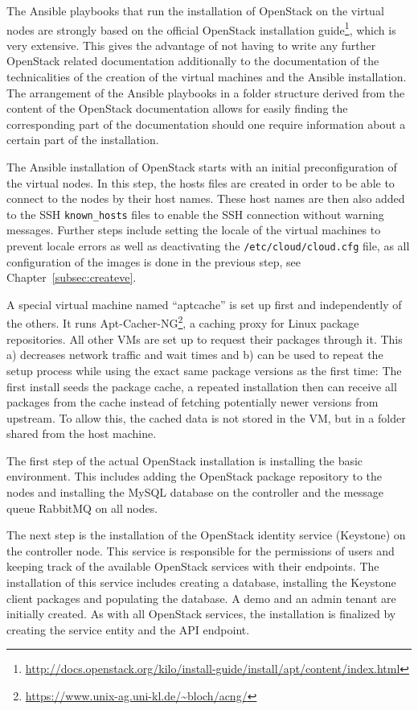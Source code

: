 The Ansible playbooks that run the installation of OpenStack on the virtual nodes are strongly based on the official OpenStack installation guide\footnote{\url{http://docs.openstack.org/kilo/install-guide/install/apt/content/index.html}}, which is very extensive. This gives the advantage of not having to write any further OpenStack related documentation additionally to the documentation of the technicalities of the creation of the virtual machines and the Ansible installation. The arrangement of the Ansible playbooks in a folder structure derived from the content of the OpenStack documentation allows for easily finding the corresponding part of the documentation should one require information about a certain part of the installation.

The Ansible installation of OpenStack starts with an initial preconfiguration of the virtual nodes. In this step, the hosts files are created in order to be able to connect to the nodes by their host names. These host names are then also added to the SSH \verb|known_hosts| files to enable the SSH connection without warning messages. Further steps include setting the locale of the virtual machines to prevent locale errors as well as deactivating the \verb|/etc/cloud/cloud.cfg| file, as all configuration of the images is done in the previous step, see Chapter~\ref{subsec:createve}.

A special virtual machine named ``aptcache'' is set up first and independently of the others. It runs Apt-Cacher-NG\footnote{\url{https://www.unix-ag.uni-kl.de/~bloch/acng/}}, a caching proxy for Linux package repositories. All other VMs are set up to request their packages through it. This a) decreases network traffic and wait times and b) can be used to repeat the setup process while using the exact same package versions as the first time: The first install seeds the package cache, a repeated installation then can receive all packages from the cache instead of fetching potentially newer versions from upstream. To allow this, the cached data is not stored in the VM, but in a folder shared from the host machine.

The first step of the actual OpenStack installation is installing the basic environment. This includes adding the OpenStack package repository to the nodes and installing the MySQL database on the controller and the message queue RabbitMQ on all nodes.

The next step is the installation of the OpenStack identity service (Keystone) on the controller node. This service is responsible for the permissions of users and keeping track of the available OpenStack services with their endpoints. The installation of this service includes creating a database, installing the Keystone client packages and populating the database. A demo and an admin tenant are initially created. As with all OpenStack services, the installation is finalized by creating the service entity and the API endpoint.

